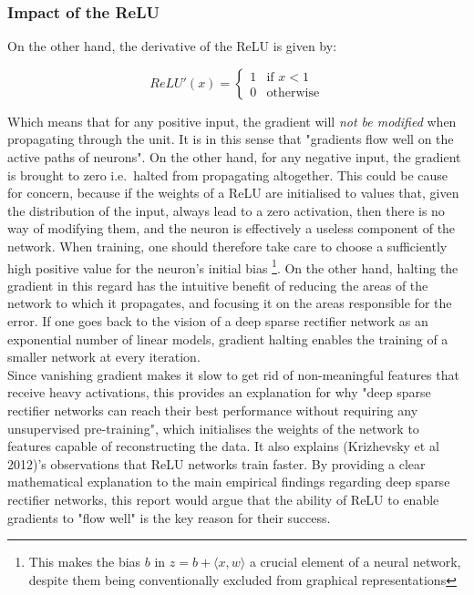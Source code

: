 \documentclass[a4paper,11pt]{article}
\begin{document}
\subsubsection{Impact of the ReLU}

On the other hand, the derivative of the ReLU is given by:

\begin{equation}
ReLU'(x) = \begin{cases} 1 & \mbox{if } x < 1\\ 
				  0 & \mbox{otherwise} \end{cases}
\end{equation} 

Which means that for any positive input, the gradient will \textit{not be modified} when propagating through the unit. It is in this sense that "gradients flow well on the active paths of neurons". On the other hand, for any negative input, the gradient is brought to zero i.e.\ halted from propagating altogether. This could be cause for concern, because if the weights of a ReLU are initialised to values that, given the distribution of the input, always lead to a zero activation, then there is no way of modifying them, and the neuron is effectively a useless component of the network. When training, one should therefore take care to choose a sufficiently high positive value for the neuron's initial bias \footnote{This makes the bias $b$ in $z = b + \langle x, w \rangle$ a crucial element of a neural network, despite them being conventionally excluded from graphical representations}. On the other hand, halting the gradient in this regard has the intuitive benefit of reducing the areas of the network to which it propagates, and focusing it on the areas responsible for the error. If one goes back to the vision of a deep sparse rectifier network as an exponential number of linear models, gradient halting enables the training of a smaller network at every iteration. \\

Since vanishing gradient makes it slow to get rid of non-meaningful features that receive heavy activations, this provides an explanation for why "deep sparse rectifier networks can reach their best performance without requiring any unsupervised pre-training", which initialises the weights of the network to features capable of reconstructing the data. It also explains (Krizhevsky et al 2012)'s observations that ReLU networks train faster. By providing a clear mathematical explanation to the main empirical findings regarding deep sparse rectifier networks, this report would argue that the ability of ReLU to enable gradients to "flow well" is the key reason for their success. \\
\end{document}

